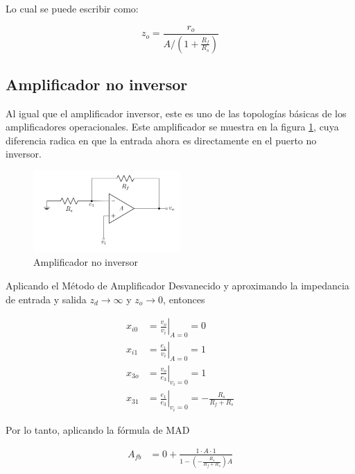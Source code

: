 Lo cual se puede escribir como:

\begin{equation}
\boxed{z_o = \frac{r_o}{A / \left( 1 + \frac{R_f}{R_s} \right)}}
\end{equation}

\subsection{Amplificador no inversor}

Al igual que el amplificador inversor, este es uno de las topologías básicas de los amplificadores operacionales. Este amplificador se muestra en la figura \ref{fig:mt-amp-no-inversor}, cuya diferencia radica en que la entrada ahora es directamente en el puerto no inversor.

\begin{figure}[ht]
    \centering
    \includegraphics[width=0.5\textwidth]{src/images/amp-no-inversor.png}
    \caption{Amplificador no inversor}
    \label{fig:mt-amp-no-inversor}
\end{figure}

Aplicando el Método de Amplificador Desvanecido y aproximando la impedancia de entrada y salida $z_d \rightarrow \infty$ y $z_o \rightarrow 0$, entonces

\begin{align*}
x_{i0} &= \left. \frac{v_o}{v_i} \right|_{A=0} = 0 \\
x_{i1} &= \left. \frac{e_1}{v_i} \right|_{A=0} = 1 \\
x_{3o} &= \left. \frac{v_o}{e_3} \right|_{v_i=0} = 1 \\
x_{31} &= \left. \frac{e_1}{e_3} \right|_{v_i=0} = -\frac{R_s}{R_f + R_s}
\end{align*}


Por lo tanto, aplicando la fórmula de MAD

\begin{align*}
A_{fb} &= 0 + \frac{1 \cdot A \cdot 1}{1 - \left( -\frac{R_s}{R_f + R_s} \right) A} \\
\end{align*}

